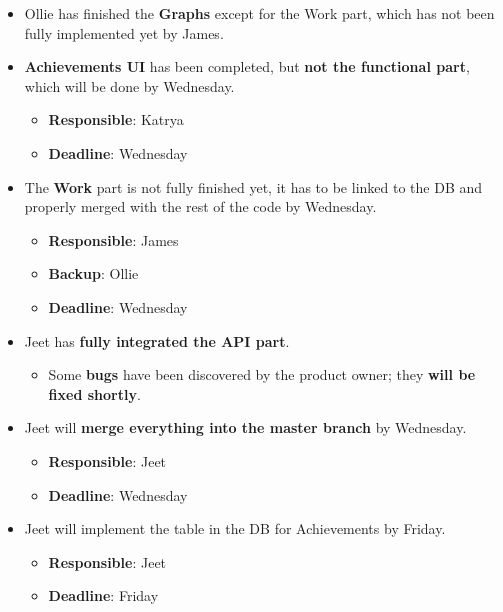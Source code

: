 \documentclass[11pt]{article}
\begin{document}
\begin{itemize}
\item
  Ollie has finished the \textbf{Graphs} except for the Work part, which
  has not been fully implemented yet by James.
\item
  \textbf{Achievements UI} has been completed, but \textbf{not the
  functional part}, which will be done by Wednesday.

  \begin{itemize}
  \tightlist
  \item
    \textbf{Responsible}: Katrya
  \item
    \textbf{Deadline}: Wednesday
  \end{itemize}
\item
  The \textbf{Work} part is not fully finished yet, it has to be linked
  to the DB and properly merged with the rest of the code by Wednesday.

  \begin{itemize}
  \tightlist
  \item
    \textbf{Responsible}: James
  \item
    \textbf{Backup}: Ollie
  \item
    \textbf{Deadline}: Wednesday
  \end{itemize}
\item
  Jeet has \textbf{fully integrated the API part}.

  \begin{itemize}
  \tightlist
  \item
    Some \textbf{bugs} have been discovered by the product owner; they
    \textbf{will be fixed shortly}.
  \end{itemize}
\item
  Jeet will \textbf{merge everything into the master branch} by
  Wednesday.

  \begin{itemize}
  \tightlist
  \item
    \textbf{Responsible}: Jeet
  \item
    \textbf{Deadline}: Wednesday
  \end{itemize}
\item
  Jeet will implement the table in the DB for Achievements by Friday.

  \begin{itemize}
  \tightlist
  \item
    \textbf{Responsible}: Jeet
  \item
    \textbf{Deadline}: Friday
  \end{itemize}
\end{itemize}
\end{document}
